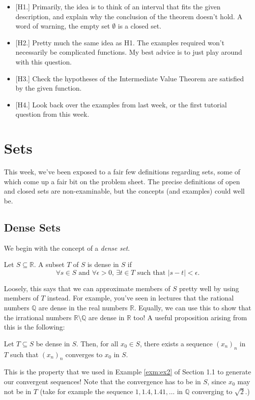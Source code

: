 \documentclass[
  17pt,
  a4paper]{extarticle}
\providecommand{\tightlist}{%
  \setlength{\itemsep}{0pt}\setlength{\parskip}{0pt}}
\theoremstyle{plain}
\theoremstyle{plain}
\theoremstyle{plain}
\theoremstyle{plain}
\theoremstyle{plain}
\theoremstyle{definition}
\theoremstyle{definition}
\theoremstyle{definition}
\theoremstyle{remark}
\let\BeginKnitrBlock\begin \let\EndKnitrBlock\end
\renewcommand{\;}{\,}
\begin{document}
\begin{itemize}
\tightlist
\item
  {[}H1.{]} Primarily, the idea is to think of an interval that fits the given description, and explain why the conclusion of the theorem doesn't hold. A word of warning, the empty set \(\emptyset\) is a closed set.
\item
  {[}H2.{]} Pretty much the same idea as H1. The examples required won't necessarily be complicated functions. My best advice is to just play around with this question.
\item
  {[}H3.{]} Check the hypotheses of the Intermediate Value Theorem are satisfied by the given function.
\item
  {[}H4.{]} Look back over the examples from last week, or the first tutorial question from this week.
\end{itemize}

\hypertarget{sets}{%
\section{Sets}\label{sets}}

This week, we've been exposed to a fair few definitions regarding sets, some of which come up a fair bit on the problem sheet. The precise definitions of open and closed sets are non-examinable, but the concepts (and examples) could well be.

\hypertarget{dense-sets}{%
\subsection{Dense Sets}\label{dense-sets}}

We begin with the concept of a \emph{dense set}.
\BeginKnitrBlock{definition}[Dense Set]
{\label{def:def3} }Let \(S \subseteq \mathbb{R}\). A subset \(T\) of \(S\) is dense in \(S\) if \[\forall s \in S \;\;\text{and}\;\; \forall \epsilon > 0,\; \exists t \in T \;\; \text{such that}\;\; \lvert s - t \rvert < \epsilon.\]
\EndKnitrBlock{definition}
Loosely, this says that we can approximate members of \(S\) pretty well by using members of \(T\) instead. For example, you've seen in lectures that the rational numbers \(\mathbb{Q}\) are dense in the real numbers \(\mathbb{R}\). Equally, we can use this to show that the irrational numbers \(\mathbb{R}\setminus\mathbb{Q}\) are dense in \(\mathbb{R}\) too! A useful proposition arising from this is the following:

\BeginKnitrBlock{proposition}
{\label{prp:prop1} }Let \(T \subseteq S\) be dense in \(S\). Then, for all \(x_0 \in S\), there exists a sequence \((x_n)_n\) in \(T\) such that \((x_n)_n\) converges to \(x_0\) in \(S\).
\EndKnitrBlock{proposition}
This is the property that we used in Example \ref{exm:ex2} of Section 1.1 to generate our convergent sequences! Note that the convergence has to be in \(S\), since \(x_0\) may not be in \(T\) (take for example the sequence \(1, 1.4, 1.41,\ldots\) in \(\mathbb{Q}\) converging to \(\sqrt{2}\).)
\end{document}
